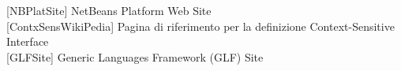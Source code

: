 \begin{thebibliography}{}

[NBPlatSite] NetBeans Platform Web Site
\\

[ContxSensWikiPedia] Pagina di riferimento per la definizione Context-Sensitive
Interface
\\

[GLFSite] Generic Languages Framework (GLF) Site	

\end{thebibliography} 